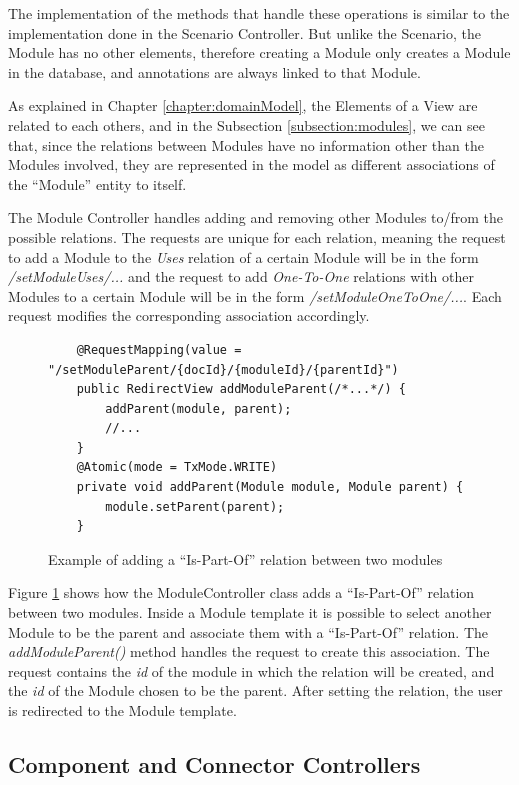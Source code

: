 The implementation of the methods that handle these operations is similar to the implementation done in the Scenario Controller. But unlike the Scenario, the Module has no other elements, therefore creating a Module only creates a Module in the database, and annotations are always linked to that Module.

As explained in Chapter \ref{chapter:domainModel}, the Elements of a View are related to each others, and in the Subsection \ref{subsection:modules}, we can see that, since the relations between Modules have no information other than the Modules involved, they are represented in the model as different associations of the ``Module'' entity to itself. 

The Module Controller handles adding and removing other Modules to/from the possible relations. The requests are unique for each relation, meaning the request to add a Module to the \textit{Uses} relation of a certain Module will be in the form \textit{/setModuleUses/...} and the request to add \textit{One-To-One} relations with other Modules to a certain Module will be in the form \textit{/setModuleOneToOne/...}. Each request modifies the corresponding association accordingly.
\begin{figure}[h]
\lstset{style=customjava}
\begin{lstlisting}
	@RequestMapping(value = "/setModuleParent/{docId}/{moduleId}/{parentId}")
	public RedirectView addModuleParent(/*...*/) {
		addParent(module, parent);
		//...
	}
	@Atomic(mode = TxMode.WRITE)
	private void addParent(Module module, Module parent) {
		module.setParent(parent);
	}	
\end{lstlisting}
\caption{Example of adding a ``Is-Part-Of'' relation between two modules}
\label{figure:ModuleControllerIsPartOf}
\end{figure} 

Figure \ref{figure:ModuleControllerIsPartOf} shows how the ModuleController class adds a ``Is-Part-Of'' relation between two modules. Inside a Module template it is possible to select another Module to be the parent and associate them with a ``Is-Part-Of'' relation. The \textit{addModuleParent()} method handles the request to create this association. The request contains the \textit{id} of the module in which the relation will be created, and the \textit{id} of the Module chosen to be the parent. After setting the relation, the user is redirected to the Module template.

\subsection{Component and Connector Controllers}

